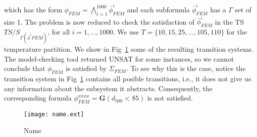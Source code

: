 \documentclass{article}
\newcommand{\Always}{\mathbf{G}}
\begin{document}
which has the form $\phi_{FEM} = \bigwedge_{i=1}^{1000} \bar{\phi}^i_{FEM}$ and
each subformula $\bar{\phi}^i_{FEM}$ has a $\Gamma$ set of size 1. The problem
is now reduced to check the satisfaction of $\bar{\phi}^i_{FEM}$ in the TS
$TS/S_{\Gamma(\bar{\phi}^i{FEM})}$, for all $i=1,...,1000$. We use $T =
\{10, 15, 25,...,105,110\}$ for the temperature partition. We show in
Fig~\ref{fig:ex_ts} some of the resulting transition systems. The model-checking
tool returned UNSAT for some instances, so we cannot conclude that $\phi_{FEM}$ is
satisfied by $\Sigma_{FEM}$. To see why this is the case, notice the transition
system in Fig~\ref{fig:ex_ts} contains all posible transitions, i.e., it does
not give us any information about the subsystem it abstracts. Consequently, the
corresponding formula $\phi_{FEM}^{xxxx} = \Always (d_{500} < 85)$ is not
satisfied.

\begin{figure}
    \centering
    \texttt{[image: name.ext]}
    \caption{Name}
    \label{fig:ex_ts}
\end{figure}
\end{document}
